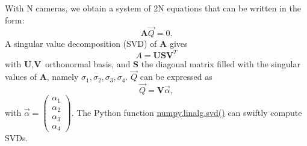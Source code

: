 \begin{algorithm}[!ht]
\begin{algorithmic}[1]
\begin{equation}
            \end{equation}
      \STATE With N cameras, we obtain a system of 2N equations that can be written in the form:
      \begin{equation}
        \textbf{A} \overrightarrow{Q} = 0.
      \end{equation}
      \STATE A singular value decomposition (SVD) of \textbf{A} gives 
      \begin{equation}
        A = \textbf{U} \textbf{S} \textbf{V}^T
      \end{equation}
      with \(\textbf{U}, \textbf{V}\) orthonormal basis, and \(\textbf{S}\) the diagonal matrix filled with the singular values of \textbf{A}, namely \(\sigma_1, \sigma_2, \sigma_3, \sigma_4\). \(\overrightarrow{Q}\) can be expressed as 
      \begin{equation}
        \overrightarrow{Q} = \textbf{V} \overrightarrow{\alpha},
      \end{equation}
      with \(\overrightarrow{\alpha} = \begin{pmatrix}\alpha_1 \\\alpha_2 \\\alpha_3 \\\alpha_4\end{pmatrix}\). The Python function \href{https://numpy.org/doc/stable/reference/generated/numpy.linalg.svd.html}{numpy.linalg.svd()} can swiftly compute SVDs. 
    \end{algorithmic}
\end{algorithm}

